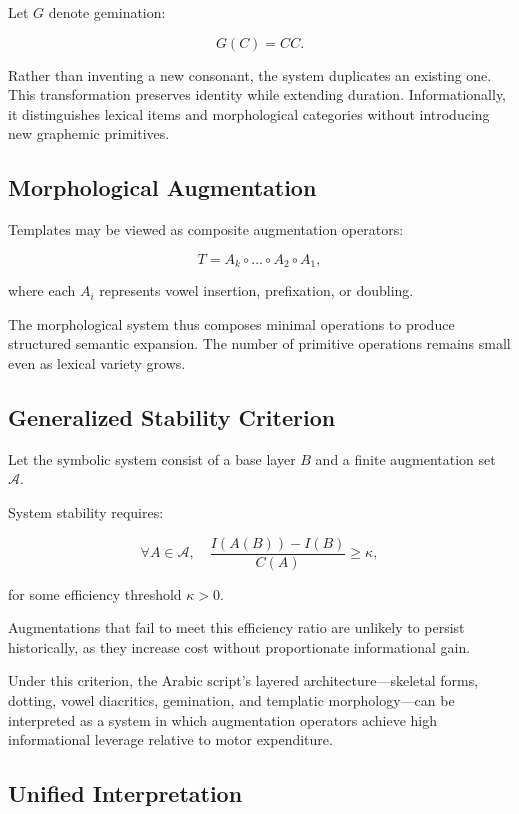 \documentclass[11pt]{article}
\begin{document}
Let $G$ denote gemination:

\[
G(C) = CC.
\]

Rather than inventing a new consonant, the system duplicates an existing one. This transformation preserves identity while extending duration. Informationally, it distinguishes lexical items and morphological categories without introducing new graphemic primitives.

\subsection{Morphological Augmentation}

Templates may be viewed as composite augmentation operators:

\[
T = A_k \circ \dots \circ A_2 \circ A_1,
\]

where each $A_i$ represents vowel insertion, prefixation, or doubling.

The morphological system thus composes minimal operations to produce structured semantic expansion. The number of primitive operations remains small even as lexical variety grows.

\subsection{Generalized Stability Criterion}

Let the symbolic system consist of a base layer $B$ and a finite augmentation set $\mathcal{A}$.

System stability requires:

\[
\forall A \in \mathcal{A}, \quad \frac{I(A(B)) - I(B)}{C(A)} \geq \kappa,
\]

for some efficiency threshold $\kappa > 0$.

Augmentations that fail to meet this efficiency ratio are unlikely to persist historically, as they increase cost without proportionate informational gain.

Under this criterion, the Arabic script’s layered architecture—skeletal forms, dotting, vowel diacritics, gemination, and templatic morphology—can be interpreted as a system in which augmentation operators achieve high informational leverage relative to motor expenditure.

\subsection{Unified Interpretation}
\end{document}
